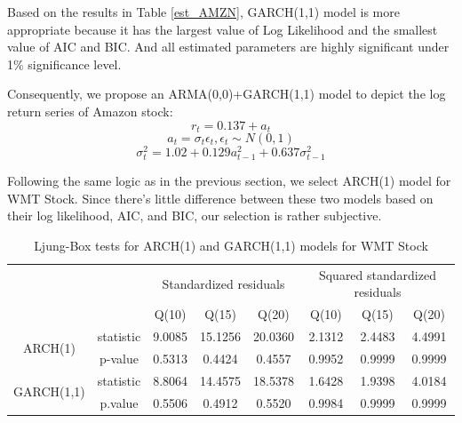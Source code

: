 \documentclass[paper=a4, fontsize=13pt]{article}
\begin{document}
Based on the results in Table \ref{est_AMZN}, GARCH(1,1) model is more appropriate because it has the largest value of Log Likelihood and the smallest value of AIC and BIC. And all estimated parameters are highly significant under 1\% significance level.

Consequently, we propose an ARMA(0,0)+GARCH(1,1) model to depict the log return series of Amazon stock:
\[ r_t = 0.137+a_t\]
\[ a_t = \sigma_t \epsilon_t, \epsilon_t \sim N(0,1) \]
\[ \sigma_t^2 = 1.02+0.129a_{t-1}^2+0.637\sigma_{t-1}^2 \]

Following the same logic as in the previous section, we select ARCH(1) model for WMT Stock. Since there’s little difference between these two models based on their log likelihood, AIC, and BIC, our selection is rather subjective.

\begin{table}[!htbp] \centering 
  \caption{Ljung-Box tests for ARCH(1) and GARCH(1,1) models for WMT Stock} 
  \label{lb_WMT} 
\begin{tabular}{cc|cccccc} 
\\[-1.8ex]\hline 
\hline
& & \multicolumn{3}{c}{Standardized residuals} & \multicolumn{3}{c}{Squared standardized residuals} \\
& & Q(10) & Q(15) & Q(20) & Q(10) & Q(15) & Q(20) \\
\hline 
\multirow{2}{*}{ARCH(1)} & statistic & 9.0085 & 15.1256 & 20.0360 & 2.1312 & 2.4483 & 4.4991 \\
& p-value & 0.5313 & 0.4424 & 0.4557 & 0.9952 & 0.9999 & 0.9999 \\
\multirow{2}{*}{GARCH(1,1)} & statistic & 8.8064 & 14.4575 & 18.5378 & 1.6428 & 1.9398 & 4.0184 \\
& p.value & 0.5506 & 0.4912 & 0.5520 & 0.9984 & 0.9999 & 0.9999 \\
\hline
\hline 
\end{tabular} 
\end{table} 
\end{document}
